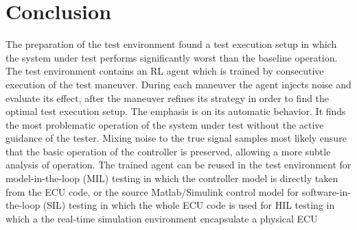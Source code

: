 \documentclass[a4paper, fleqn]{cas-dc}
\begin{document}
	\section{Conclusion}
	The preparation of the test environment found a test execution setup in which the system under test performs significantly worst than the baseline operation. The test environment contains an RL agent which is trained by consecutive execution of the test maneuver. During each maneuver the agent injects noise and evaluate its effect, after the maneuver refines its strategy in order to find the optimal test execution setup.
	The emphasis is on its automatic behavior. It finds the most problematic operation of the system under test without the active guidance of the tester. Mixing noise to the true signal samples most likely ensure that the basic operation of the controller is preserved, allowing a more subtle analysis of operation.
	The trained agent can be reused in the test environment for model-in-the-loop (MIL) testing in which the controller model is directly taken from the ECU code, or the source Matlab/Simulink control model for software-in-the-loop (SIL) testing in which the whole ECU code is used for HIL testing in which a the real-time simulation environment encapsulate a physical ECU

		
	
	
	\listoftodos		
\end{document}

